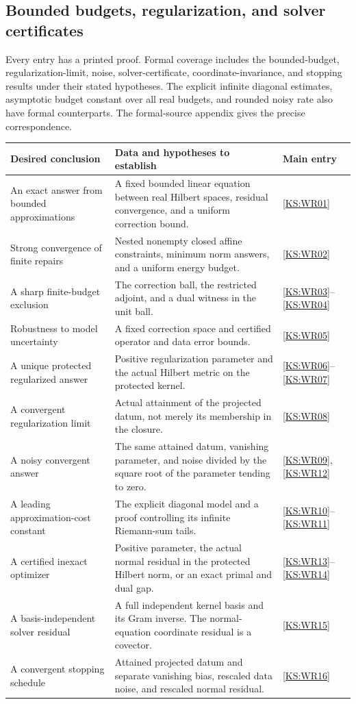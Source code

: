 \documentclass[11pt,oneside,openany]{book}
\numberwithin{equation}{section}
\begin{document}
\subsection{Bounded budgets, regularization, and solver certificates}
Every entry has a printed proof. Formal coverage includes the bounded-budget, regularization-limit, noise, solver-certificate, coordinate-invariance, and stopping results under their stated hypotheses. The explicit infinite diagonal estimates, asymptotic budget constant over all real budgets, and rounded noisy rate also have formal counterparts. The formal-source appendix gives the precise correspondence.
\begin{longtable}{@{}p{.24\linewidth}p{.48\linewidth}p{.21\linewidth}@{}}
\toprule Desired conclusion & Data and hypotheses to establish & Main entry\\\midrule\endhead
An exact answer from bounded approximations & A fixed bounded linear equation between real Hilbert spaces, residual convergence, and a uniform correction bound. & \ref{KS:WR01}\\[4pt]
Strong convergence of finite repairs & Nested nonempty closed affine constraints, minimum norm answers, and a uniform energy budget. & \ref{KS:WR02}\\[4pt]
A sharp finite-budget exclusion & The correction ball, the restricted adjoint, and a dual witness in the unit ball. & \ref{KS:WR03}--\ref{KS:WR04}\\[4pt]
Robustness to model uncertainty & A fixed correction space and certified operator and data error bounds. & \ref{KS:WR05}\\[4pt]
A unique protected regularized answer & Positive regularization parameter and the actual Hilbert metric on the protected kernel. & \ref{KS:WR06}--\ref{KS:WR07}\\[4pt]
A convergent regularization limit & Actual attainment of the projected datum, not merely its membership in the closure. & \ref{KS:WR08}\\[4pt]
A noisy convergent answer & The same attained datum, vanishing parameter, and noise divided by the square root of the parameter tending to zero. & \ref{KS:WR09}, \ref{KS:WR12}\\[4pt]
A leading approximation-cost constant & The explicit diagonal model and a proof controlling its infinite Riemann-sum tails. & \ref{KS:WR10}--\ref{KS:WR11}\\[4pt]
A certified inexact optimizer & Positive parameter, the actual normal residual in the protected Hilbert norm, or an exact primal and dual gap. & \ref{KS:WR13}--\ref{KS:WR14}\\[4pt]
A basis-independent solver residual & A full independent kernel basis and its Gram inverse. The normal-equation coordinate residual is a covector. & \ref{KS:WR15}\\[4pt]
A convergent stopping schedule & Attained projected datum and separate vanishing bias, rescaled data noise, and rescaled normal residual. & \ref{KS:WR16}\\\bottomrule
\end{longtable}
\end{document}
